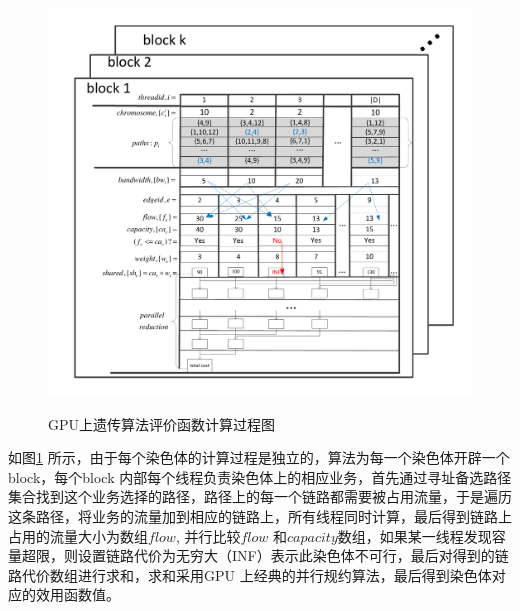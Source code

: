 \begin{figure}
\begin{center}
{\includegraphics[width=1 \textwidth]{figures/GPUfitness.pdf}}
\end{center}
\caption{{\footnotesize{GPU上遗传算法评价函数计算过程图}}}
\label{fitness}
\end{figure}
如图\ref{fitness} 所示，由于每个染色体的计算过程是独立的，算法为每一个染色体开辟一个block，每个block 内部每个线程负责染色体上的相应业务，首先通过寻址备选路径集合找到这个业务选择的路径，路径上的每一个链路都需要被占用流量，于是遍历这条路径，将业务的流量加到相应的链路上，所有线程同时计算，最后得到链路上占用的流量大小为数组$flow$, 并行比较$flow$ 和$capacity$数组，如果某一线程发现容量超限，则设置链路代价为无穷大（INF）表示此染色体不可行，最后对得到的链路代价数组进行求和，求和采用GPU 上经典的并行规约算法，最后得到染色体对应的效用函数值。

